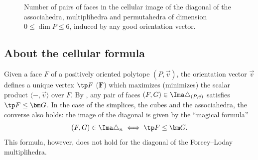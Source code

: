 \documentclass[JEP,XML,SOM,NoFloatCountersInSection,Unicode,published]{cedram}
\theoremstyle{definition}
\theoremstyle{plain}
\begin{document}
\medskip

\begin{figure}[htb]
\caption{Number of pairs of faces in the cellular image of the diagonal of the associahedra, multiplihedra and permutahedra of dimension $0\leq \dim P \leq 6$, induced by any good orientation vector.}
\label{table:numerology}
\end{figure}

\subsection{About the cellular formula}
\label{ss:about}

Given a face $F$ of a positively oriented polytope $(P, \vec v)$, the orientation vector $\vec v$ defines a unique vertex $\tp F$ (\resp $\bm F$) which maximizes (\resp minimizes) the scalar product $\langle -, \vec v \rangle$ over $F$.
By \cite[Prop.\,1.17]{LA21}, any pair of faces $(F,G) \in \Ima \triangle_{(P,\vec v)}$ satisfies $\tp F \leq \bm G$.
In the case of the simplices, the cubes and the associahedra, the converse also holds: the image of the diagonal is given by the ``magical formula''
\begin{equation}
\label{eq:magical-formula}
(F,G) \in \Ima \triangle_n \iff \tp F\leq \bm G.
\end{equation}
This formula, however, does not hold for the diagonal of the Forcey--Loday multiplihedra.
\end{document}
